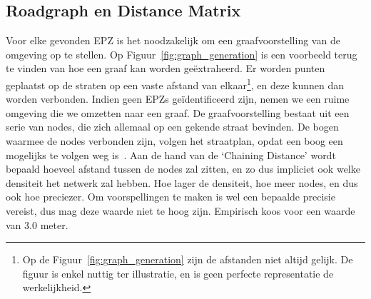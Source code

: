 \subsection{Roadgraph en Distance Matrix}\label{sec:roadgraph}
Voor elke gevonden EPZ is het noodzakelijk om een graafvoorstelling van de
omgeving op te stellen. Op Figuur~\ref{fig:graph_generation} is een voorbeeld
terug te vinden van hoe een graaf kan worden geëxtraheerd. Er worden punten
geplaatst op de straten op een vaste afstand van
elkaar\footnote{\label{fn:roadgraph}Op de Figuur~\ref{fig:graph_generation}
    zijn de afstanden niet altijd gelijk. De figuur is enkel nuttig ter
    illustratie, en is geen perfecte representatie de werkelijkheid.}, en deze
kunnen dan worden verbonden. Indien geen \acp{EPZ} geïdentificeerd zijn, nemen
we een ruime omgeving die we omzetten naar een graaf. De graafvoorstelling
bestaat uit een serie van nodes, die zich allemaal op een gekende straat
bevinden. De bogen waarmee de nodes verbonden zijn, volgen het straatplan,
opdat een boog een mogelijks te volgen weg is~\cite{neira2022graph}. Aan de
hand van de `Chaining Distance' wordt bepaald hoeveel afstand tussen de nodes
zal zitten, en zo dus impliciet ook welke densiteit het netwerk zal hebben. Hoe
lager de densiteit, hoe meer nodes, en dus ook hoe preciezer. Om voorspellingen
te maken is wel een bepaalde precisie vereist, dus mag deze waarde niet te hoog
zijn. Empirisch koos \citeauthor{Dhondt} voor een waarde van $3.0$ meter.
